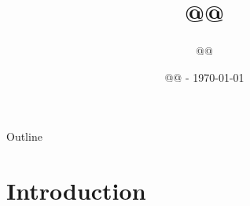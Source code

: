 \documentclass{beamer}
\title{@@}
\author{@@}
\institute{@@}
\date{@@ - \today}
\begin{document}
\begin{frame}
\titlepage
\end{frame}

\begin{frame}{Outline}
\tableofcontents
\end{frame}

\section{Introduction}
\end{document}
